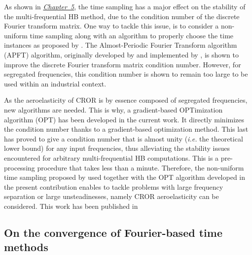 As shown in \hyperref[cha:limitations_condition_number]{\emph{Chapter~5}},
the time sampling has a major effect on the
stability of the multi-frequential HB 
method, due to the condition number of the discrete Fourier
transform matrix. One way to tackle this issue, 
is to consider a non-uniform time sampling
along with an algorithm to properly choose the time instances
as proposed by \citet{ThesisGuedeney}.
The Almost-Periodic Fourier Transform algorithm (APFT) 
algorithm, originally developed by \citet{Kundert1988} and implemented by 
\citet{ThesisGuedeney}, is shown to improve the discrete
Fourier transform matrix condition number.
However, for segregated frequencies, this condition number
is shown to remain too large to be used within an industrial context.

As the aeroelasticity of CROR is by essence
composed of segregated frequencies, new algorithms are needed.
This is why, a gradient-based OPTimization algorithm (OPT) 
has been developed in the current work.
It directly minimizes the condition number thanks to a
gradient-based optimization method. This last has proved to
give a condition number that is almost unity (\emph{i.e.} the
theoretical lower bound) for any input frequencies,
thus alleviating the stability issues encountered for arbitrary
multi-frequential HB computations.
This is a pre-processing procedure
that takes less than a minute.
Therefore, the non-uniform time sampling proposed by \citet{ThesisGuedeney}
used together with the OPT algorithm 
developed in the present contribution
enables to tackle problems with large frequency 
separation or large unsteadinesses, namely CROR aeroelasticity
can be considered.
This work has been published in
\begin{quote}
\end{quote}


\subsection*{On the convergence of Fourier-based time methods}

